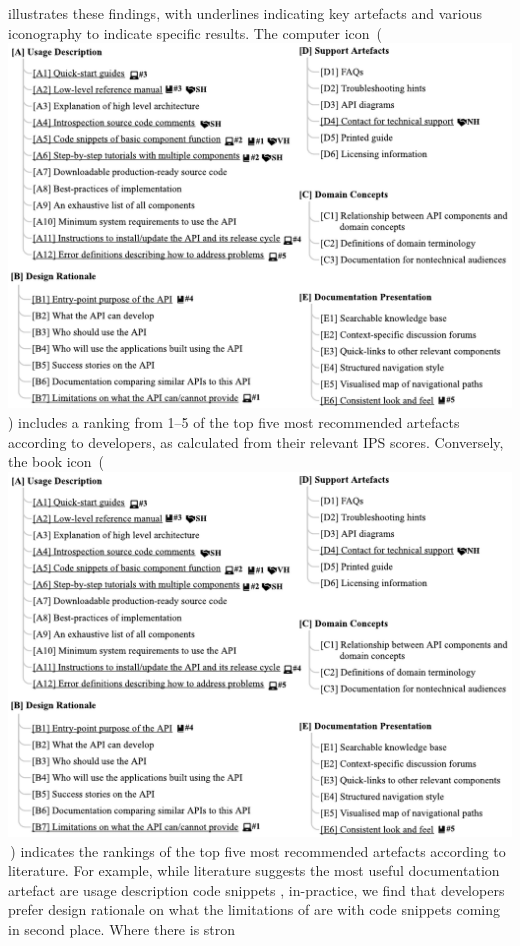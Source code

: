  illustrates these findings, with underlines indicating key artefacts and various iconography to indicate specific results. The computer icon~(\includegraphics{computer}) includes a ranking from 1--5 of the top five most recommended artefacts according to developers, as calculated from their relevant IPS scores. Conversely, the book icon~(\,\includegraphics{book}\,) indicates the rankings of the top five most recommended artefacts according to literature. For example, while literature suggests the most useful documentation artefact are  usage description code snippets , in-practice, we find that developers prefer design rationale on what the limitations of  are  with code snippets coming in second place. Where there is stron
